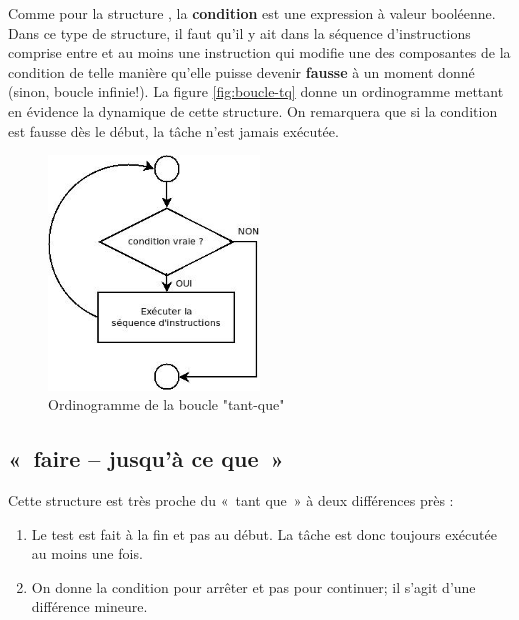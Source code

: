 		Comme pour la structure , la \textbf{condition} est
		une expression à valeur booléenne. Dans ce type de structure, il faut
		qu’il y ait dans la séquence d’instructions comprise entre
		 et  au moins une
		instruction qui modifie une des composantes de la condition de telle
		manière qu’elle puisse devenir \textbf{fausse} à un moment donné
		(sinon, boucle infinie!). La figure \vref{fig:boucle-tq} donne 
		un ordinogramme mettant en évidence la dynamique de cette structure. 
		On remarquera que si la condition est fausse dès le début, 
		la tâche n'est jamais exécutée.

		\begin{figure}[h]
		\centering
		\includegraphics[width=0.5\textwidth]{image/boucle-tq}
		\caption{Ordinogramme de la boucle "tant-que"}
		\label{fig:boucle-tq}
		\end{figure}
		
	\subsection{«~faire – jusqu'à ce que~»}

		Cette structure est très proche du «~tant que~» 
		à deux différences près :
	
		\begin{enumerate}
		\item {
			Le test est fait à la fin et pas au début. La tâche est donc toujours
			exécutée au moins une fois. }
		\item {
			On donne la condition pour arrêter et pas pour continuer; il
			s'agit d'une différence mineure.}
		\end{enumerate}


